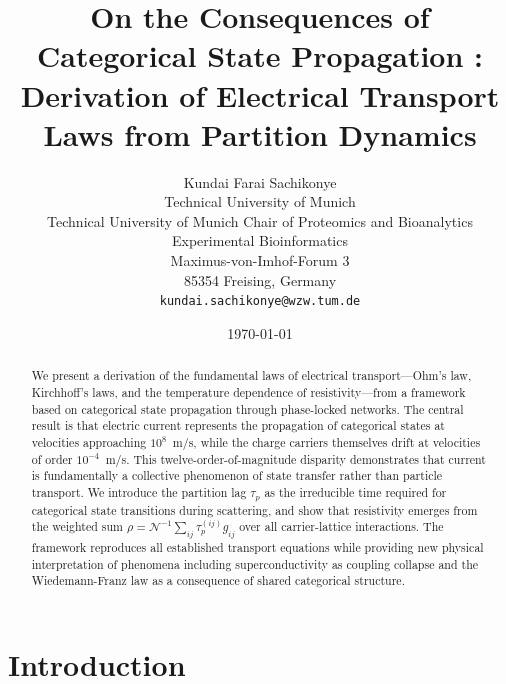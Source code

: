 \documentclass[twocolumn,showpacs,preprintnumbers,amsmath,amssymb,prd]{revtex4-2}
\newcommand{\taup}{\tau_p}
\begin{document}
\title{On the Consequences of Categorical State Propagation : \\ Derivation of Electrical Transport Laws from Partition Dynamics}

\author{
Kundai Farai Sachikonye\\
Technical University of Munich\\
Technical University of Munich Chair of Proteomics and Bioanalytics \\
Experimental Bioinformatics \\
Maximus-von-Imhof-Forum 3\\
85354 Freising, Germany\\
\texttt{kundai.sachikonye@wzw.tum.de}
}

\date{\today}

\begin{abstract}
We present a derivation of the fundamental laws of electrical transport---Ohm's law, Kirchhoff's laws, and the temperature dependence of resistivity---from a framework based on categorical state propagation through phase-locked networks. The central result is that electric current represents the propagation of categorical states at velocities approaching $10^8$~m/s, while the charge carriers themselves drift at velocities of order $10^{-4}$~m/s. This twelve-order-of-magnitude disparity demonstrates that current is fundamentally a collective phenomenon of state transfer rather than particle transport. We introduce the partition lag $\taup$ as the irreducible time required for categorical state transitions during scattering, and show that resistivity emerges from the weighted sum $\rho = \mathcal{N}^{-1}\sum_{ij}\taup^{(ij)}g_{ij}$ over all carrier-lattice interactions. The framework reproduces all established transport equations while providing new physical interpretation of phenomena including superconductivity as coupling collapse and the Wiedemann-Franz law as a consequence of shared categorical structure.
\end{abstract}


\maketitle

\section{Introduction}
\label{sec:introduction}
\end{document}
